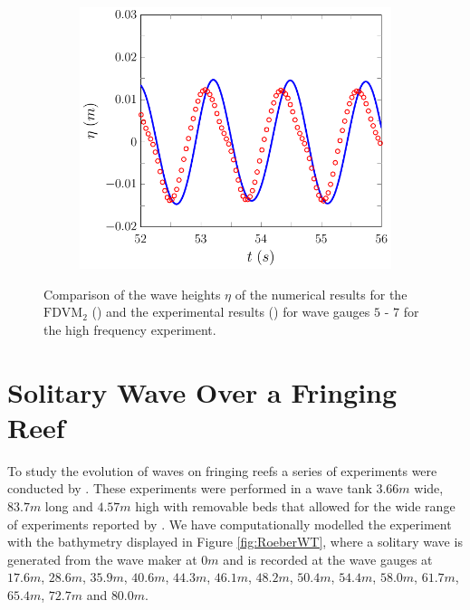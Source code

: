 \begin{figure}
\begin{subfigure}{0.5\textwidth}
		\vspace{0.5cm}
	\end{subfigure}
	\begin{subfigure}{0.5\textwidth}
		\includegraphics[width=\textwidth]{./chp6/figures/Experiment/Beji/sh/FDVMWG7.pdf}
		\vspace{0.5cm}
	\end{subfigure}
	\caption{Comparison of the wave heights $\eta$ of the numerical results for the $\text{FDVM}_2$ ({\color{blue}\solidrule}) and the experimental results () for wave gauges $5$ - $7$ for the high frequency experiment.}
	\label{fig:BejishWG5to7FDVM}
\end{figure}

\section{Solitary Wave Over a Fringing Reef}
To study the evolution of waves on fringing reefs a series of experiments were conducted by \citet{Roeber-2010}. These experiments were performed in a wave tank $3.66m$ wide, $83.7m$ long and $4.57m$ high with removable beds that allowed for the wide range of experiments reported by \citet{Roeber-2010}. We have computationally modelled the experiment with the bathymetry displayed in Figure \ref{fig:RoeberWT}, where a solitary wave is generated from the wave maker at $0m$ and is recorded at the wave gauges at $17.6m$, $28.6m$, $35.9m$, $40.6m$, $44.3m$, $46.1m$, $48.2m$, $50.4m$, $54.4m$, $58.0m$, $61.7m$, $65.4m$, $72.7m$ and $80.0m$.

